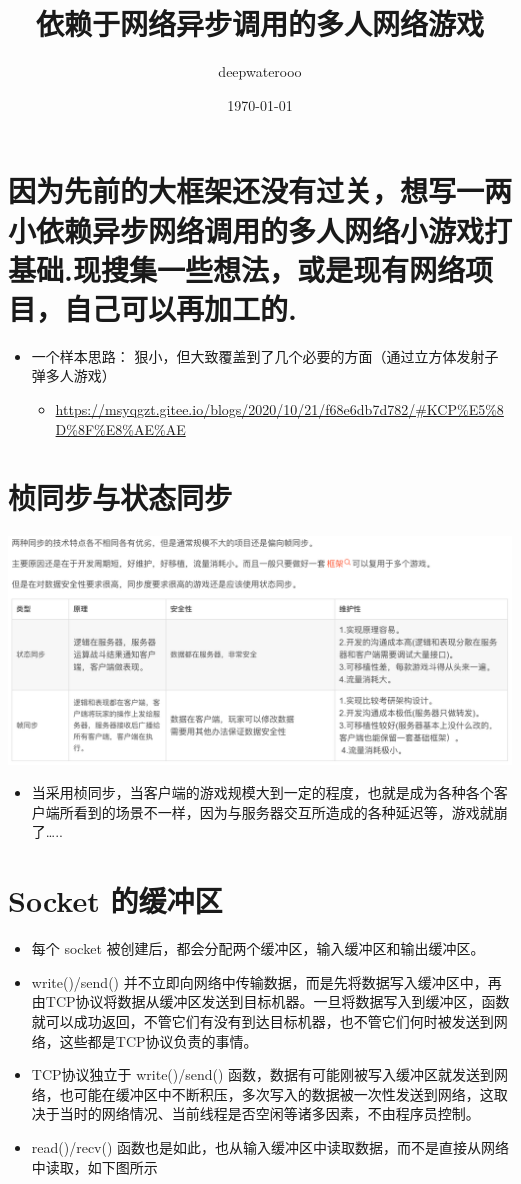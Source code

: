 \documentclass[9pt, b5paper]{article}
\author{deepwaterooo}
\date{\today}
\title{依赖于网络异步调用的多人网络游戏}
\begin{document}
\maketitle
\tableofcontents


\section{因为先前的大框架还没有过关，想写一两小依赖异步网络调用的多人网络小游戏打基础.现搜集一些想法，或是现有网络项目，自己可以再加工的.}
\label{sec-1}
\begin{itemize}
\item 一个样本思路： 狠小，但大致覆盖到了几个必要的方面（通过立方体发射子弹多人游戏）
\begin{itemize}
\item \url{https://msyqgzt.gitee.io/blogs/2020/10/21/f68e6db7d782/#KCP\%E5\%8D\%8F\%E8\%AE\%AE}
\end{itemize}
\end{itemize}

\section{桢同步与状态同步}
\label{sec-2}

\includegraphics[width=.9\linewidth]{./pic/readme_20230209_150634.png}
\begin{itemize}
\item 当采用桢同步，当客户端的游戏规模大到一定的程度，也就是成为各种各个客户端所看到的场景不一样，因为与服务器交互所造成的各种延迟等，游戏就崩了\ldots{}..
\end{itemize}
\section{Socket 的缓冲区}
\label{sec-3}
\begin{itemize}
\item 每个 socket 被创建后，都会分配两个缓冲区，输入缓冲区和输出缓冲区。
\item write()/send() 并不立即向网络中传输数据，而是先将数据写入缓冲区中，再由TCP协议将数据从缓冲区发送到目标机器。一旦将数据写入到缓冲区，函数就可以成功返回，不管它们有没有到达目标机器，也不管它们何时被发送到网络，这些都是TCP协议负责的事情。
\item TCP协议独立于 write()/send() 函数，数据有可能刚被写入缓冲区就发送到网络，也可能在缓冲区中不断积压，多次写入的数据被一次性发送到网络，这取决于当时的网络情况、当前线程是否空闲等诸多因素，不由程序员控制。
\item read()/recv() 函数也是如此，也从输入缓冲区中读取数据，而不是直接从网络中读取，如下图所示
\end{itemize}
\end{document}
